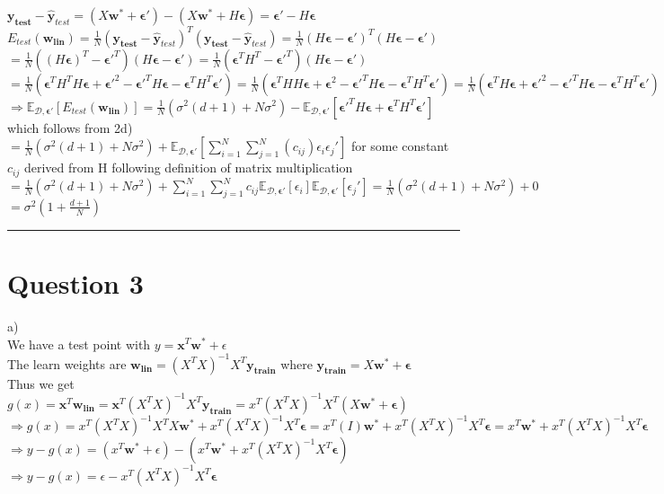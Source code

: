 \documentclass{article}
\begin{document}
$\bm{y_{test}}-\bm{\hat{y}}_{test} = (X\bm{w}^* + \bm{\epsilon}') - (X\bm{w}^* + H\bm{\epsilon}) = \bm{\epsilon}' -  H\bm{\epsilon} $ \\ 
$ E_{test}(\bm{w_{lin}}) = \frac{1}{N}(\bm{y_{test}} - \bm{\hat{y}}_{test})^T ( \bm{y_{test}} - \bm{\hat{y}}_{test} ) = \frac{1}{N}(H\bm{\epsilon} - \bm{\epsilon}')^T(H\bm{\epsilon} - \bm{\epsilon}') $ \\ 
$ = \frac{1}{N}( (H\bm{\epsilon})^T  - \bm{\epsilon}'^T )(H\bm{\epsilon} - \bm{\epsilon}') = \frac{1}{N} ( \bm{\epsilon}^TH^T - \bm{\epsilon}'^T)(H\bm{\epsilon}-\bm{\epsilon}') $ \\
$ = \frac{1}{N}(\bm{\epsilon}^TH^TH\bm{\epsilon} + \bm{\epsilon}'^2  - \bm{\epsilon}'^TH\bm{\epsilon} - \bm{\epsilon}^TH^T\bm{\epsilon'}) = \frac{1}{N}(\bm{\epsilon}^THH\bm{\epsilon} + \bm{\epsilon}^2  - \bm{\epsilon}'^TH\bm{\epsilon} - \bm{\epsilon}^TH^T\bm{\epsilon}') = \frac{1}{N}(\bm{\epsilon}^TH\bm{\epsilon} + \bm{\epsilon}'^2  - \bm{\epsilon}'^TH\bm{\epsilon} - \bm{\epsilon}^TH^T\bm{\epsilon}')$
$ \Rightarrow \mathbb{E}_{\mathcal{D}, \bm{\epsilon}'}[E_{test}(\bm{w_{lin}})]= \frac{1}{N} ( \sigma^2(d+1) + N\sigma^2) - \mathbb{E}_{\mathcal{D}, \bm{\epsilon'}}[\bm{\epsilon}'^TH\bm{\epsilon} + \bm{\epsilon}^TH^T\bm{\epsilon}']$ which follows from 2d) \\ 
$ = \frac{1}{N} ( \sigma^2(d+1) + N\sigma^2) + \mathbb{E}_{\mathcal{D}, \bm{\epsilon}'}[\sum_{i=1}^N \sum_{j=1}^N (c_{ij}) \epsilon_i \epsilon_j'] $ for some constant $c_{ij}$ derived from H following definition of matrix multiplication \\
$ = \frac{1}{N} ( \sigma^2(d+1) + N\sigma^2)  + \sum_{i=1}^N \sum_{j=1}^N c_{ij} \mathbb{E}_{\mathcal{D}, \bm{\epsilon}'}[\epsilon_i] \mathbb{E}_{\mathcal{D}, \bm{\epsilon}'}[\epsilon_j'] = \frac{1}{N} ( \sigma^2(d+1) + N\sigma^2)  + 0  $ \\ 
$  = \sigma^2(1 + \frac{d+1}{N})$

\par\noindent\rule{\textwidth}{0.4pt}

\section*{Question 3}

a) \\ 

We have a test point with $y=\bm{x}^T\bm{w}^* + \epsilon $ \\ 
The learn weights are $\bm{w_{lin}} = (X^TX)^{-1}X^T\bm{y_{train}}$ where $\bm{y_{train}} = X\bm{w}^* + \bm{ \epsilon }  $ \\ 
Thus we get $g(x) = \bm{x}^T\bm{w_{lin}} = \bm{x}^T (X^TX)^{-1}X^T\bm{y_{train}} = x^T (X^TX)^{-1}X^T(X\bm{w}^*+\bm{ \epsilon })$ \\
$\Rightarrow g(x) = x^T (X^TX)^{-1}X^TX\bm{w}^* +x^T (X^TX)^{-1}X^T \bm{\epsilon} = x^T(I)\bm{w}^* + x^T (X^TX)^{-1}X^T \bm{\epsilon} = x^T\bm{w}^* +   x^T (X^TX)^{-1}X^T \bm{\epsilon} $
\\
$\Rightarrow y - g(x) = (x^T\bm{w}^* + \epsilon) - (x^T\bm{w}^* +   x^T (X^TX)^{-1}X^T \bm{\epsilon})$ \\
$\Rightarrow y - g(x) = \epsilon - x^T (X^TX)^{-1}X^T \bm{\epsilon} $
\end{document}
